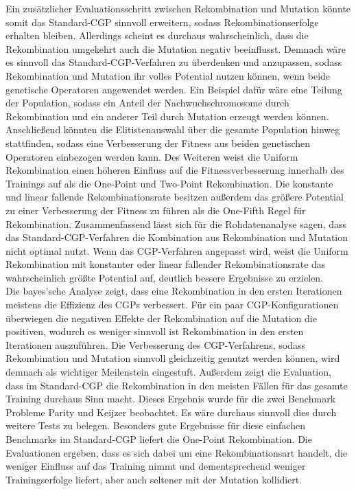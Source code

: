Ein zusätzlicher Evaluationsschritt zwischen Rekombination und Mutation könnte somit das Standard-CGP sinnvoll erweitern, sodass Rekombinationserfolge erhalten bleiben.
Allerdings scheint es durchaus wahrscheinlich, dass die Rekombination umgekehrt auch die Mutation negativ beeinflusst.
Demnach wäre es sinnvoll das Standard-CGP-Verfahren zu überdenken und anzupassen, sodass Rekombination und Mutation ihr volles Potential nutzen können, wenn beide genetische Operatoren angewendet werden.
Ein Beispiel dafür wäre eine Teilung der Population, sodass ein Anteil der Nachwuchschromosome durch Rekombination und ein anderer Teil durch Mutation erzeugt werden können.
Anschließend könnten die Elitistenauswahl über die gesamte Population hinweg stattfinden, sodass eine Verbesserung der Fitness aus beiden genetischen Operatoren einbezogen werden kann.
Des Weiteren weist die Uniform Rekombination einen höheren Einfluss auf die Fitnessverbesserung innerhalb des Trainings auf als die One-Point und Two-Point Rekombination.
Die konstante und linear fallende Rekombinationsrate besitzen außerdem das größere Potential zu einer Verbesserung der Fitness zu führen als die One-Fifth Regel für Rekombination.
Zusammenfassend lässt sich für die Rohdatenanalyse sagen, dass das Standard-CGP-Verfahren die Kombination aus Rekombination und Mutation nicht optimal nutzt.
Wenn das CGP-Verfahren angepasst wird, weist die Uniform Rekombination mit konstanter oder linear fallender Rekombinationsrate das wahrscheinlich größte Potential auf, deutlich bessere Ergebnisse zu erzielen.\\
Die bayes'sche Analyse zeigt, dass eine Rekombination in den ersten Iterationen meistens die Effizienz des CGPs verbessert.
Für ein paar CGP-Konfigurationen überwiegen die negativen Effekte der Rekombination auf die Mutation die positiven, wodurch es weniger sinnvoll ist Rekombination in den ersten Iterationen auszuführen.
Die Verbesserung des CGP-Verfahrens, sodass Rekombination und Mutation sinnvoll gleichzeitig genutzt werden können, wird demnach als wichtiger Meilenstein eingestuft.
Außerdem zeigt die Evaluation, dass im Standard-CGP die Rekombination in den meisten Fällen für das gesamte Training durchaus Sinn macht.
Dieses Ergebnis wurde für die zwei Benchmark Probleme Parity und Keijzer beobachtet.
Es wäre durchaus sinnvoll dies durch weitere Tests zu belegen.
Besonders gute Ergebnisse für diese einfachen Benchmarks im Standard-CGP liefert die One-Point Rekombination.
Die Evaluationen ergeben, dass es sich dabei um eine Rekombinationsart handelt, die weniger Einfluss auf das Training nimmt und dementsprechend weniger Trainingserfolge liefert, aber auch seltener mit der Mutation kollidiert.

